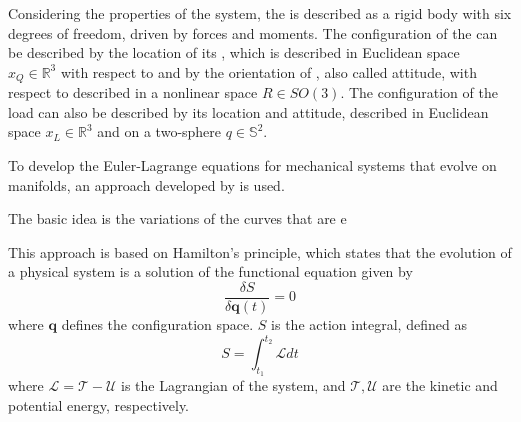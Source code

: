 Considering the properties of the system, the  is described as a rigid body with six degrees of freedom, driven by forces and moments. 
The configuration of the  can be described by the location of its , which is described in Euclidean space $x_Q\in \mathbb{R}^3 $ with respect to \IF and by the orientation of \BF, also called attitude, with respect to \IF described in a nonlinear space $R\in SO(3) $.
The configuration of the load can also be described by its location and attitude, described in Euclidean space $x_L\in \mathbb{R}^3 $ and on a two-sphere $ q\in \mathbb{S}^2 $.




To develop the Euler-Lagrange equations for mechanical systems that evolve on manifolds, an approach developed by \cite{Lee2008,Lee2005,Lee2009,Lee2011} is used. 

The basic idea is the variations of the curves that are e	

This approach is based on Hamilton's principle, which states that the evolution of a physical system is a solution of the functional equation given by
\begin{equation}\label{key}
\frac{\delta S}{\delta \mathbf{q}(t)}=0
\end{equation}
where $ \mathbf{q} $ defines the configuration space. $ S $ is the action integral, defined as
\begin{equation}\label{eq:actionintegral}
S=\int_{t_1}^{t_2}\mathcal{L}dt
\end{equation}
where $\mathcal{L}=\mathcal{T}-\mathcal{U} $ is the Lagrangian of the system, and $\mathcal{T},\mathcal{U}$ are the kinetic and potential energy, respectively. 


